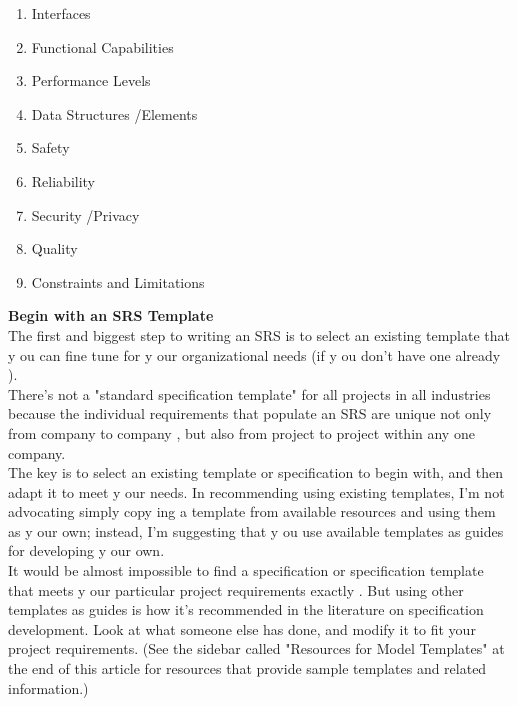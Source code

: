 \begin{enumerate}

\item Interfaces
\item Functional Capabilities
\item Performance Levels
\item Data Structures
/Elements
\item Safety

\item Reliability

\item Security
/Privacy

\item Quality

\item Constraints and Limitations

\end{enumerate}
\textbf{Begin with an SRS Template}\\

The first and biggest step to writing an SRS is to select an existing template that y
ou can fine
tune for y
our organizational needs (if y
ou don't have one already
). \\

There's not a "standard
specification template" for all projects in all industries because the individual requirements
that populate an SRS are unique not only
 from company
 to company
, but also from project to
project within any
 one company.\\

The key
 is to select an existing template or specification to
begin with, and then adapt it to meet y
our needs.
In recommending using existing templates, I'm not advocating simply
 copy
ing a template
from available resources and using them as y
our own; instead, I'm suggesting that y
ou use
available templates as guides for developing y
our own. \\

It would be almost impossible to find
a specification or specification template that meets y
our particular project requirements
exactly
. But using other templates as guides is how it's recommended in the literature on
specification development. Look at what someone else has done, and modify
 it to fit your project requirements. (See the sidebar called "Resources for Model Templates" at the end of
this article for resources that provide sample templates and related information.)

